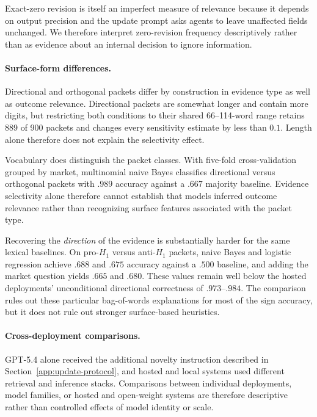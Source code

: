 Exact-zero revision is itself an imperfect measure of relevance because it depends on output precision and the update prompt asks agents to leave unaffected fields unchanged.
We therefore interpret zero-revision frequency descriptively rather than as evidence about an internal decision to ignore information.

\paragraph{Surface-form differences.}

Directional and orthogonal packets differ by construction in evidence type as well as outcome relevance.
Directional packets are somewhat longer and contain more digits, but restricting both conditions to their shared 66--114-word range retains 889 of 900 packets and changes every sensitivity estimate by less than $0.1$.
Length alone therefore does not explain the selectivity effect.

Vocabulary does distinguish the packet classes.
With five-fold cross-validation grouped by market, multinomial naive Bayes classifies directional versus orthogonal packets with $.989$ accuracy against a $.667$ majority baseline.
Evidence selectivity alone therefore cannot establish that models inferred outcome relevance rather than recognizing surface features associated with the packet type.

Recovering the \emph{direction} of the evidence is substantially harder for the same lexical baselines.
On pro-$H_1$ versus anti-$H_1$ packets, naive Bayes and logistic regression achieve $.688$ and $.675$ accuracy against a $.500$ baseline, and adding the market question yields $.665$ and $.680$.
These values remain well below the hosted deployments' unconditional directional correctness of $.973$--$.984$.
The comparison rules out these particular bag-of-words explanations for most of the sign accuracy, but it does not rule out stronger surface-based heuristics.

\paragraph{Cross-deployment comparisons.}

GPT-5.4 alone received the additional novelty instruction described in Section~\ref{app:update-protocol}, and hosted and local systems used different retrieval and inference stacks.
Comparisons between individual deployments, model families, or hosted and open-weight systems are therefore descriptive rather than controlled effects of model identity or scale.

